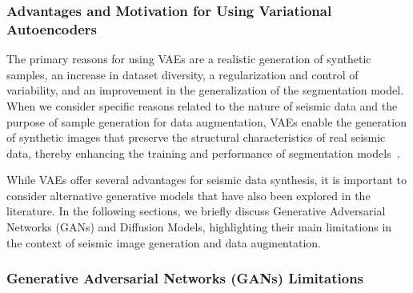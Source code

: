 \documentclass{ieeeaccess}
\begin{document}
\subsubsection{Advantages and Motivation for Using Variational Autoencoders}
The primary reasons for using VAEs are a realistic generation of synthetic samples, an increase in dataset diversity, a regularization and control of variability, and an improvement in the generalization of the segmentation model. When we consider specific reasons related to the nature of seismic data and the purpose of sample generation for data augmentation, VAEs enable the generation of synthetic images that preserve the structural characteristics of real seismic data, thereby enhancing the training and performance of segmentation models~\cite{Henriques2021,Wang2021,Anjom2024}.

While VAEs offer several advantages for seismic data synthesis, it is important to consider alternative generative models that have also been explored in the literature. In the following sections, we briefly discuss Generative Adversarial Networks (GANs) and Diffusion Models, highlighting their main limitations in the context of seismic image generation and data augmentation.

\subsubsection{Generative Adversarial Networks (GANs) Limitations}
\end{document}
